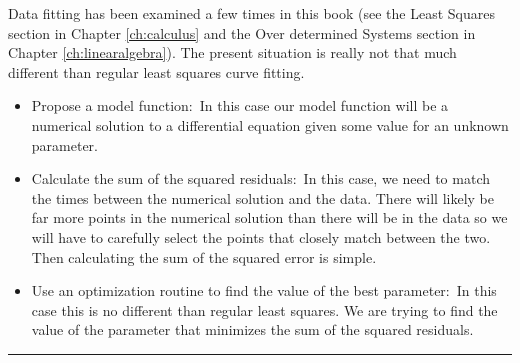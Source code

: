 \documentclass[
]{book}
\providecommand{\tightlist}{%
  \setlength{\itemsep}{0pt}\setlength{\parskip}{0pt}}
\theoremstyle{definition}
\theoremstyle{definition}
\theoremstyle{definition}
\theoremstyle{remark}
\begin{document}
Data fitting has been examined a few times in this book (see the Least Squares section in Chapter \ref{ch:calculus} and the Over determined Systems section in Chapter \ref{ch:linearalgebra}). The present situation is really not that much different than regular least squares curve fitting.

\begin{itemize}
\tightlist
\item
  Propose a model function:~In this case our model function will be a numerical solution to a differential equation given some value for an unknown parameter.
\item
  Calculate the sum of the squared residuals:~In this case, we need to match the times between the numerical solution and the data. There will likely be far more points in the numerical solution than there will be in the data so we will have to carefully select the points that closely match between the two. Then calculating the sum of the squared error is simple.
\item
  Use an optimization routine to find the value of the best parameter:~In this case this is no different than regular least squares. We are trying to find the value of the parameter that minimizes the sum of the squared residuals.
\end{itemize}

\begin{center}\rule{0.5\linewidth}{0.5pt}\end{center}
\end{document}
